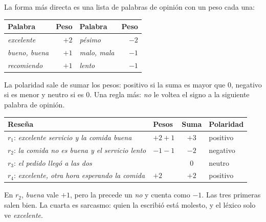 \documentclass[11pt,letterpaper]{article}
\begin{document}
\begin{ejemplo}
    La forma más directa es una lista de palabras de opinión con un
    peso cada una:
    \begin{center}
    \small
    \begin{tabular}{lr@{\qquad}lr}
        \toprule
        \textbf{Palabra} & \textbf{Peso} & \textbf{Palabra}
            & \textbf{Peso} \\
        \midrule
        \textit{excelente} & $+2$ & \textit{pésimo} & $-2$ \\
        \textit{bueno, buena} & $+1$ & \textit{malo, mala} & $-1$ \\
        \textit{recomiendo} & $+1$ & \textit{lento} & $-1$ \\
        \bottomrule
    \end{tabular}
    \end{center}
    La polaridad sale de sumar los pesos: positivo si la suma es
    mayor que $0$, negativo si es menor y neutro si es $0$. Una regla
    más: \textit{no} le voltea el signo a la siguiente palabra de
    opinión.
    \begin{center}
    \small
    \begin{tabular}{>{\raggedright\arraybackslash}p{5.4cm}lcl}
        \toprule
        \textbf{Reseña} & \textbf{Pesos} & \textbf{Suma}
            & \textbf{Polaridad} \\
        \midrule
        $r_1$: \textit{excelente servicio y la comida buena}
            & $+2 + 1$ & $+3$ & positivo \\
        $r_2$: \textit{la comida no es buena y el servicio lento}
            & $-1 - 1$ & $-2$ & negativo \\
        $r_3$: \textit{el pedido llegó a las dos}
            & & $0$ & neutro \\
        $r_4$: \textit{excelente, otra hora esperando la comida}
            & $+2$ & $+2$ & positivo \\
        \bottomrule
    \end{tabular}
    \end{center}
    En $r_2$, \textit{buena} vale $+1$, pero la precede un
    \textit{no} y cuenta como $-1$. Las tres primeras salen bien. La
    cuarta es sarcasmo: quien la escribió está molesto, y el léxico
    solo ve \textit{excelente}.
    \begin{center}
    \begin{tikzpicture}[>=stealth,
        res/.style={circle, fill=acento, inner sep=1.8pt},
        et/.style={font=\scriptsize, above=3pt}]

\end{tikzpicture}
\end{center}
\end{ejemplo}
\end{document}
